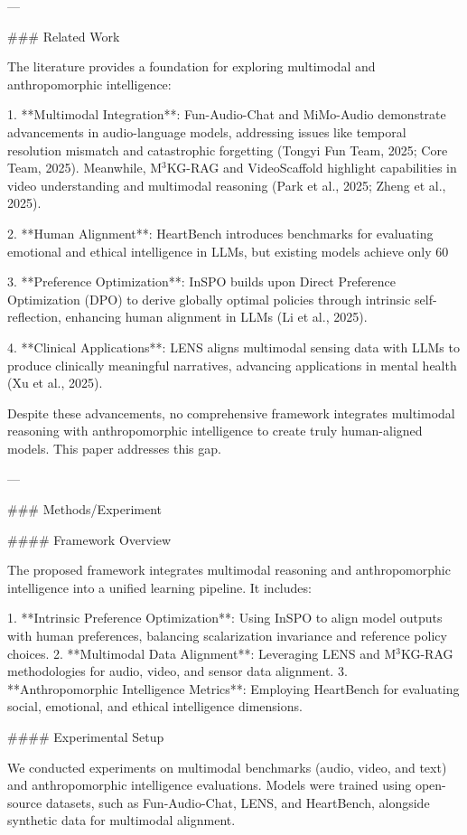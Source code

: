 ---

### Related Work

The literature provides a foundation for exploring multimodal and anthropomorphic intelligence:

1. **Multimodal Integration**: Fun-Audio-Chat and MiMo-Audio demonstrate advancements in audio-language models, addressing issues like temporal resolution mismatch and catastrophic forgetting (Tongyi Fun Team, 2025; Core Team, 2025). Meanwhile, M$^3$KG-RAG and VideoScaffold highlight capabilities in video understanding and multimodal reasoning (Park et al., 2025; Zheng et al., 2025).

2. **Human Alignment**: HeartBench introduces benchmarks for evaluating emotional and ethical intelligence in LLMs, but existing models achieve only 60%

3. **Preference Optimization**: InSPO builds upon Direct Preference Optimization (DPO) to derive globally optimal policies through intrinsic self-reflection, enhancing human alignment in LLMs (Li et al., 2025).

4. **Clinical Applications**: LENS aligns multimodal sensing data with LLMs to produce clinically meaningful narratives, advancing applications in mental health (Xu et al., 2025).

Despite these advancements, no comprehensive framework integrates multimodal reasoning with anthropomorphic intelligence to create truly human-aligned models. This paper addresses this gap.

---

### Methods/Experiment

#### Framework Overview

The proposed framework integrates multimodal reasoning and anthropomorphic intelligence into a unified learning pipeline. It includes:

1. **Intrinsic Preference Optimization**: Using InSPO to align model outputs with human preferences, balancing scalarization invariance and reference policy choices.
2. **Multimodal Data Alignment**: Leveraging LENS and M$^3$KG-RAG methodologies for audio, video, and sensor data alignment.
3. **Anthropomorphic Intelligence Metrics**: Employing HeartBench for evaluating social, emotional, and ethical intelligence dimensions.

#### Experimental Setup

We conducted experiments on multimodal benchmarks (audio, video, and text) and anthropomorphic intelligence evaluations. Models were trained using open-source datasets, such as Fun-Audio-Chat, LENS, and HeartBench, alongside synthetic data for multimodal alignment.

